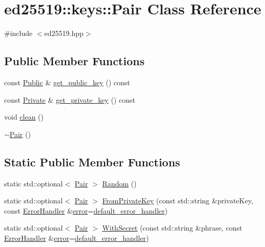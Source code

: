 \hypertarget{classed25519_1_1keys_1_1_pair}{}\section{ed25519\+:\+:keys\+:\+:Pair Class Reference}
\label{classed25519_1_1keys_1_1_pair}


{\ttfamily \#include $<$ed25519.\+hpp$>$}

\subsection*{Public Member Functions}
\begin{DoxyCompactItemize}
\item 
const \mbox{\hyperlink{classed25519_1_1keys_1_1_public}{Public}} \& \mbox{\hyperlink{classed25519_1_1keys_1_1_pair_aad6c01fdb3b75ce2b05e51dbc833ac72}{get\+\_\+public\+\_\+key}} () const
\item 
const \mbox{\hyperlink{classed25519_1_1keys_1_1_private}{Private}} \& \mbox{\hyperlink{classed25519_1_1keys_1_1_pair_add9c9587c53dff8b1d5bc69a7a97f837}{get\+\_\+private\+\_\+key}} () const
\item 
void \mbox{\hyperlink{classed25519_1_1keys_1_1_pair_ae803e41096e0f6edb030e48713515aa2}{clean}} ()
\item 
\mbox{\hyperlink{classed25519_1_1keys_1_1_pair_a23edc59bc943684eadbdae8ffd6c8a42}{$\sim$\+Pair}} ()
\end{DoxyCompactItemize}
\subsection*{Static Public Member Functions}
\begin{DoxyCompactItemize}
\item 
static std\+::optional$<$ \mbox{\hyperlink{classed25519_1_1keys_1_1_pair}{Pair}} $>$ \mbox{\hyperlink{classed25519_1_1keys_1_1_pair_a56deb8f1bf6d1a51313abebd5a41d6fc}{Random}} ()
\item 
static std\+::optional$<$ \mbox{\hyperlink{classed25519_1_1keys_1_1_pair}{Pair}} $>$ \mbox{\hyperlink{classed25519_1_1keys_1_1_pair_aa4b34f7823cbba1e4243b9fbf2745e1e}{From\+Private\+Key}} (const std\+::string \&private\+Key, const \mbox{\hyperlink{namespaceed25519_a6ba572942b3c18591fc869d52a6b16e6}{Error\+Handler}} \&\mbox{\hyperlink{namespaceed25519_ac93d0b5156eaca22197055e902920bc4}{error}}=\mbox{\hyperlink{namespaceed25519_a7c7bb6ed17541162959c33ed3e3b15fb}{default\+\_\+error\+\_\+handler}})
\item 
static std\+::optional$<$ \mbox{\hyperlink{classed25519_1_1keys_1_1_pair}{Pair}} $>$ \mbox{\hyperlink{classed25519_1_1keys_1_1_pair_a3d7457b834d7e8091a61272f20132d01}{With\+Secret}} (const std\+::string \&phrase, const \mbox{\hyperlink{namespaceed25519_a6ba572942b3c18591fc869d52a6b16e6}{Error\+Handler}} \&\mbox{\hyperlink{namespaceed25519_ac93d0b5156eaca22197055e902920bc4}{error}}=\mbox{\hyperlink{namespaceed25519_a7c7bb6ed17541162959c33ed3e3b15fb}{default\+\_\+error\+\_\+handler}})
\end{DoxyCompactItemize}


